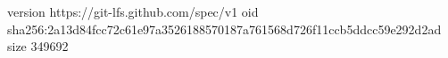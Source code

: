 version https://git-lfs.github.com/spec/v1
oid sha256:2a13d84fcc72c61e97a3526188570187a761568d726f11ccb5ddcc59e292d2ad
size 349692
